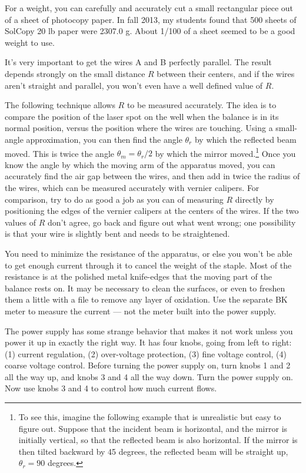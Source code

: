 For a weight, you can carefully and accurately cut a small rectangular piece
out of a sheet of photocopy paper. In fall 2013, my students found that 500
sheets of SolCopy 20 lb paper were 2307.0 g. About 1/100 of a sheet seemed to
be a good weight to use.

It's very important to get the wires A and B perfectly parallel. The result
depends strongly on the small distance $R$ between their centers, and if the
wires aren't straight and parallel, you won't even have a well defined value
of $R$. 

The following
technique allows $R$ to be measured accurately.
The idea is to compare the position
of the laser spot on the well when the balance is in its normal position, versus
the position where the wires are touching. Using a small-angle approximation, you can then find
the angle $\theta_r$ by which the reflected beam moved. This is twice the angle
$\theta_m=\theta_r/2$ by which the mirror moved.\footnote{To see this, imagine the following
example that is unrealistic but easy to figure out. Suppose that
the incident beam is horizontal, and the mirror is initially vertical, so that the reflected
beam is also horizontal. If the mirror is then tilted backward by 45 degrees, the reflected
beam will be straight up, $\theta_r=90$ degrees.}
Once you know the angle by which the moving arm of the apparatus moved, you can accurately
find the air gap between the wires, and then add in twice the radius of the wires, which can
be measured accurately with vernier calipers. For comparison, try to do as good a job as
you can of measuring $R$ directly by positioning the edges of the vernier calipers at the
centers of the wires. If the two values of $R$ don't agree, go back and figure out what
went wrong; one possibility is that your wire is slightly bent and needs to be straightened.

You need to minimize the resistance of the apparatus, or else you won't be
able to get enough current through it to cancel the weight of the staple.
Most of the resistance is at the polished metal knife-edges that the
moving part of the balance rests on. It may be necessary to clean the
surfaces, or even to freshen them a little with a file to remove any layer
of oxidation. Use the separate BK meter to measure the current --- not the
meter built into the power supply.

The power supply has some strange behavior that makes it not work unless
you power it up in exactly the right way. It has four knobs, going from
left to right: (1) current regulation, (2) over-voltage protection, (3)
fine voltage control, (4) coarse voltage control. Before turning the power
supply on, turn knobs 1 and 2 all the way up, and knobs 3 and 4 all the way
down. Turn the power supply on. Now use knobs 3 and 4 to control how much
current flows.

